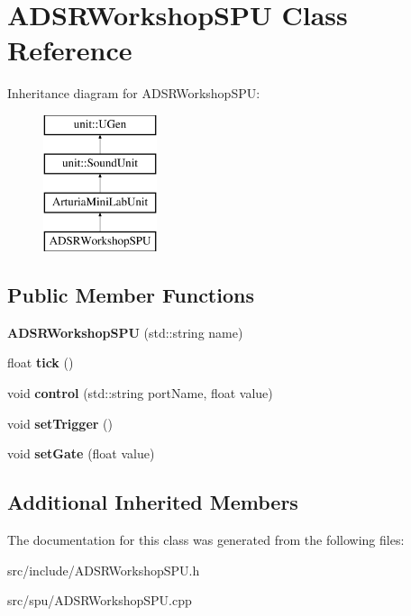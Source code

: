 \hypertarget{classADSRWorkshopSPU}{\section{A\-D\-S\-R\-Workshop\-S\-P\-U Class Reference}
\label{classADSRWorkshopSPU}
}
Inheritance diagram for A\-D\-S\-R\-Workshop\-S\-P\-U\-:\begin{figure}[H]
\begin{center}
\leavevmode
\includegraphics[height=4.000000cm]{classADSRWorkshopSPU}
\end{center}
\end{figure}
\subsection*{Public Member Functions}
\begin{DoxyCompactItemize}
\item 
\hypertarget{classADSRWorkshopSPU_a2140f477c0bdc9fac9b66a6c103bb126}{{\bfseries A\-D\-S\-R\-Workshop\-S\-P\-U} (std\-::string name)}\label{classADSRWorkshopSPU_a2140f477c0bdc9fac9b66a6c103bb126}

\item 
\hypertarget{classADSRWorkshopSPU_a8ec50457bbb3455b797f87cdb9988164}{float {\bfseries tick} ()}\label{classADSRWorkshopSPU_a8ec50457bbb3455b797f87cdb9988164}

\item 
\hypertarget{classADSRWorkshopSPU_af50b5a155375a444b9ebfe154b643409}{void {\bfseries control} (std\-::string port\-Name, float value)}\label{classADSRWorkshopSPU_af50b5a155375a444b9ebfe154b643409}

\item 
\hypertarget{classADSRWorkshopSPU_a961200f724c466c0dc0a0156dd01cbcc}{void {\bfseries set\-Trigger} ()}\label{classADSRWorkshopSPU_a961200f724c466c0dc0a0156dd01cbcc}

\item 
\hypertarget{classADSRWorkshopSPU_a51be23dcf951c1e752c218bf3c0be9bd}{void {\bfseries set\-Gate} (float value)}\label{classADSRWorkshopSPU_a51be23dcf951c1e752c218bf3c0be9bd}

\end{DoxyCompactItemize}
\subsection*{Additional Inherited Members}


The documentation for this class was generated from the following files\-:\begin{DoxyCompactItemize}
\item 
src/include/A\-D\-S\-R\-Workshop\-S\-P\-U.\-h\item 
src/spu/A\-D\-S\-R\-Workshop\-S\-P\-U.\-cpp\end{DoxyCompactItemize}
